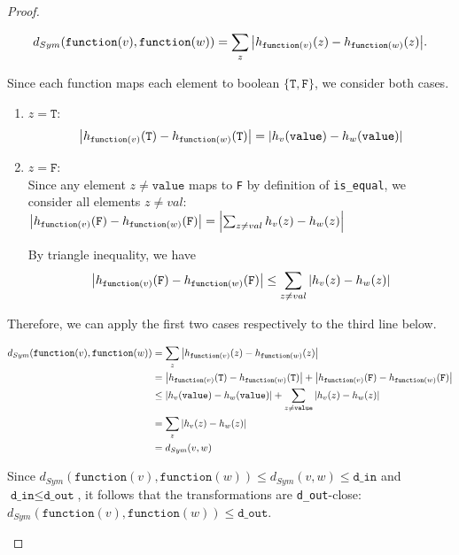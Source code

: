 \documentclass[11pt,a4paper]{article}
\newcommand{\grace}[1]{{ {\color{purple}{(grace)~#1}}}}
\newcommand{\din}{\texttt{d\_in}}
\newcommand{\dout}{\texttt{d\_out}}
\newcommand{\T}{\texttt{T} }
\newcommand{\F}{\texttt{F} }
\newcommand{\function}{\texttt{function}}
\begin{document}
\begin{proof}
\begin{enumerate}
$$d_{Sym}(\function(v), \function(w)) = \sum_z \abs{h_{\function(v)}(z) - h_{\function(w)}(z)}.$$

Since each function maps each element to boolean $\{ \T, \F\}$, we consider both cases. 
\begin{enumerate}
    \item $z = \T$:\\
    $$\abs{h_{\function(v)}(\T) - h_{\function(w)}(\T)} = \abs{h_v(\texttt{value}) - h_w(\texttt{value})}$$
    
    \item $z = \F$:\\
    
    Since any element $z \neq \texttt{value}$ maps to \F by definition of \texttt{is\_equal}, we consider all elements $z \neq val$:
    $\abs{h_{\function(v)}(\F) - h_{\function(w)}(\F)} = \abs{\sum_{z \neq val} h_v(z) - h_w(z)}$
    
    By triangle inequality, we have 
    $$\abs{h_{\function(v)}(\F) - h_{\function(w)}(\F)} \leq \sum_{z \neq val} \abs{h_v(z) - h_w(z)}$$
\end{enumerate}


Therefore, we can apply the first two cases respectively to the third line below. 

\begin{align*}
    d_{Sym}(\function(v), \function(w)) &= \sum_z \abs{h_{\function(v)}(z) - h_{\function(w)}(z)} \\
    &= \abs{h_{\function(v)}(\T) - h_{\function(w)}(\T)} + \abs{h_{\function(v)}(\F) - h_{\function(w)}(\F)} \\ 
    &\leq \abs{h_{v}(\texttt{value}) - h_{w}(\texttt{value})} + \sum_{z \neq \texttt{value}} \abs{h_{v}(z) - h_{w}(z)}\\
    &= \sum_z \abs{h_{v}(z) - h_{w}(z)} \\
    &= d_{Sym}(v, w)
\end{align*}

Since $d_{Sym}(\function(v), \function(w)) \leq d_{Sym}(v, w) \leq \din$ and $\din \leq \dout$, it follows that the transformations are \dout-close: $d_{Sym}(\function(v), \function(w)) \leq \dout$.
\grace{TODO in the next round of edits, will use Salil's suggested proof outline with row by row transformation abstraction. This will get rid of casework?}


\end{enumerate}
\end{proof}
\end{document}
